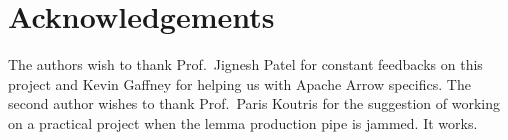 \documentclass[10pt]{article}
\begin{document}
\section*{Acknowledgements}

The authors wish to thank Prof.\ Jignesh Patel for constant feedbacks on this project and Kevin Gaffney for helping us with Apache Arrow specifics. The second author wishes to thank Prof.\ Paris Koutris for the suggestion of working on a practical project when the lemma production pipe is jammed. It works.


{}

\end{document}
